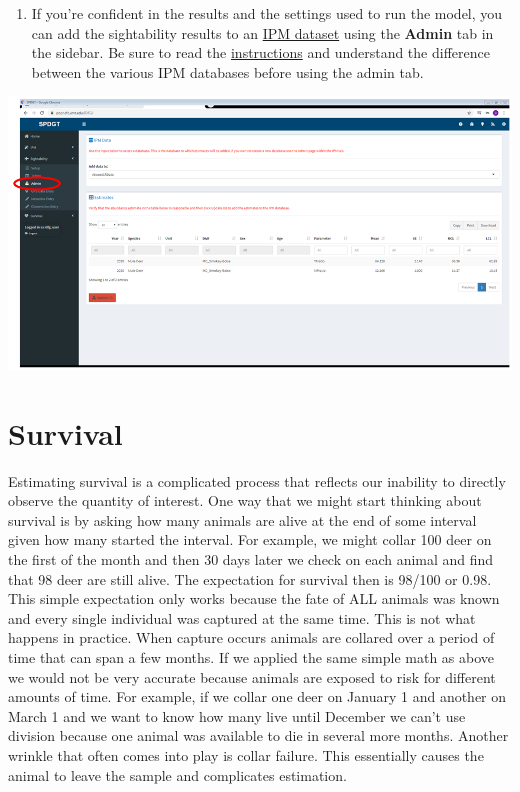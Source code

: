 \documentclass[
]{book}
\providecommand{\tightlist}{%
  \setlength{\itemsep}{0pt}\setlength{\parskip}{0pt}}
\begin{document}
\begin{enumerate}
\def\labelenumi{\arabic{enumi}.}
\setcounter{enumi}{12}
\tightlist
\item
  If you're confident in the results and the settings used to run the model, you can add the sightability results to an \protect\hyperlink{gl-ipm-db}{IPM dataset} using the \textbf{Admin} tab in the sidebar. Be sure to read the \protect\hyperlink{sight-admin}{instructions} and understand the difference between the various IPM databases before using the admin tab.
\end{enumerate}

\includegraphics{./www/sight_15.PNG}

\hypertarget{surv}{%
\chapter{Survival}\label{surv}}

Estimating survival is a complicated process that reflects our inability to directly observe the quantity of interest. One way that we might start thinking about survival is by asking how many animals are alive at the end of some interval given how many started the interval. For example, we might collar 100 deer on the first of the month and then 30 days later we check on each animal and find that 98 deer are still alive. The expectation for survival then is 98/100 or 0.98. This simple expectation only works because the fate of ALL animals was known and every single individual was captured at the same time. This is not what happens in practice. When capture occurs animals are collared over a period of time that can span a few months. If we applied the same simple math as above we would not be very accurate because animals are exposed to risk for different amounts of time. For example, if we collar one deer on January 1 and another on March 1 and we want to know how many live until December we can't use division because one animal was available to die in several more months. Another wrinkle that often comes into play is collar failure. This essentially causes the animal to leave the sample and complicates estimation.
\end{document}
